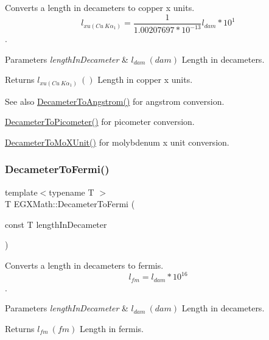 Converts a length in decameters to copper x units. \[ l_{xu(Cu\ K\alpha_1)}= \frac{1}{1.00207697*10^{-13}} l_{dam} * 10^{1}\]. 


\begin{DoxyParams}{Parameters}
{\em length\+In\+Decameter} & $ l_{dam}\ (dam)$ Length in decameters. \\
\hline
\end{DoxyParams}
\begin{DoxyReturn}{Returns}
$ l_{xu(Cu\ K\alpha_1)}\ ()$ Length in copper x units. 
\end{DoxyReturn}
\begin{DoxySeeAlso}{See also}
\mbox{\hyperlink{group___e_g_x_math-_conversions-_length_conversions-_s_i-_decameter-_non-_s_i_ga2ea722ea1c773432c2680fe6ebd67638}{Decameter\+To\+Angstrom()}} for angstrom conversion. 

\mbox{\hyperlink{group___e_g_x_math-_conversions-_length_conversions-_s_i-_decameter-_s_i_gab265bbced03f7b08cf4ad0db29da6dfd}{Decameter\+To\+Picometer()}} for picometer conversion. 

\mbox{\hyperlink{group___e_g_x_math-_conversions-_length_conversions-_s_i-_decameter-_non-_s_i_ga9e345feeb2568ded9fdceaf1d23d0ca6}{Decameter\+To\+Mo\+X\+Unit()}} for molybdenum x unit conversion. 
\end{DoxySeeAlso}
\mbox{\label{group___e_g_x_math-_conversions-_length_conversions-_s_i-_decameter-_non-_s_i_gadc348f062b782f64f13784377f032f9b}} 
\subsubsection{\texorpdfstring{Decameter\+To\+Fermi()}{DecameterToFermi()}}
{\footnotesize\ttfamily template$<$typename T $>$ \\
T E\+G\+X\+Math\+::\+Decameter\+To\+Fermi (\begin{DoxyParamCaption}\item[{const T}]{length\+In\+Decameter }\end{DoxyParamCaption})}



Converts a length in decameters to fermis. \[ l_{fm}=l_{dam} * 10^{16} \]. 


\begin{DoxyParams}{Parameters}
{\em length\+In\+Decameter} & $ l_{dam}\ (dam)$ Length in decameters. \\
\hline
\end{DoxyParams}
\begin{DoxyReturn}{Returns}
$ l_{fm}\ (fm)$ Length in fermis. 
\end{DoxyReturn}
\mbox{\label{group___e_g_x_math-_conversions-_length_conversions-_s_i-_decameter-_non-_s_i_gaf3c7befd051b823dc17aca5318cae689}} 
